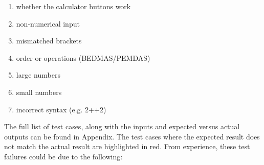 \documentclass[letterpaper]{article}
\begin{document}
\begin{enumerate}
    \item whether the calculator buttons work
    \item non-numerical input
    \item mismatched brackets
    \item order or operations (BEDMAS/PEMDAS)
    \item large numbers
    \item small numbers
    \item incorrect syntax (e.g. 2++2)
\end{enumerate}

The full list of test cases, along with the inputs and expected versus actual outputs can be found in Appendix.
The test cases where the expected result does not match the actual result are highlighted in red.
From experience, these test failures could be due to the following:
\end{document}
